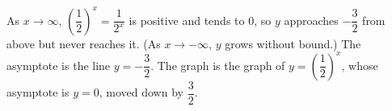 As $x\to\infty$, $\left(\dfrac{1}{2}\right)^x=\dfrac{1}{2^x}$ is positive and tends to $0$, so $y$ approaches $-\dfrac{3}{2}$ from above but never reaches it. (As $x\to-\infty$, $y$ grows without bound.) The asymptote is the line $\boxed{y=-\dfrac{3}{2}}$. The graph is the graph of $y=\left(\dfrac{1}{2}\right)^x$, whose asymptote is $y=0$, moved down by $\dfrac{3}{2}$.
